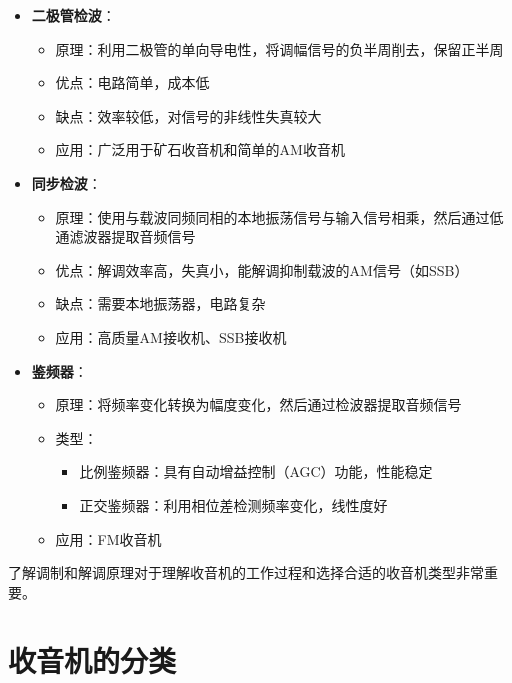 \documentclass[12pt,UTF8]{ctexbook}
\begin{document}
\begin{itemize}[leftmargin=3.5em]
    \item \textbf{二极管检波}：
    \begin{itemize}[leftmargin=3.5em]
        \item 原理：利用二极管的单向导电性，将调幅信号的负半周削去，保留正半周
        \item 优点：电路简单，成本低
        \item 缺点：效率较低，对信号的非线性失真较大
        \item 应用：广泛用于矿石收音机和简单的AM收音机
    \end{itemize}
    
    \item \textbf{同步检波}：
    \begin{itemize}[leftmargin=3.5em]
        \item 原理：使用与载波同频同相的本地振荡信号与输入信号相乘，然后通过低通滤波器提取音频信号
        \item 优点：解调效率高，失真小，能解调抑制载波的AM信号（如SSB）
        \item 缺点：需要本地振荡器，电路复杂
        \item 应用：高质量AM接收机、SSB接收机
    \end{itemize}
    
    \item \textbf{鉴频器}：
    \begin{itemize}[leftmargin=3.5em]
        \item 原理：将频率变化转换为幅度变化，然后通过检波器提取音频信号
        \item 类型：
        \begin{itemize}[leftmargin=3.5em]
            \item 比例鉴频器：具有自动增益控制（AGC）功能，性能稳定
            \item 正交鉴频器：利用相位差检测频率变化，线性度好
        \end{itemize}
        \item 应用：FM收音机
    \end{itemize}
\end{itemize}

了解调制和解调原理对于理解收音机的工作过程和选择合适的收音机类型非常重要。

\section{收音机的分类}
\end{document}
